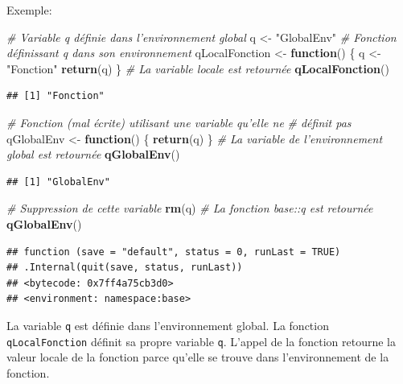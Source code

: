 \documentclass[
  12pt,
  french,
  a4paper,
  extrafontsizes,onecolumn,openright
  ]{memoir}
\newenvironment{Shaded}{\begin{snugshade}}{\end{snugshade}}
\newcommand{\CommentTok}[1]{\textcolor[rgb]{0.56,0.35,0.01}{\textit{#1}}}
\newcommand{\ControlFlowTok}[1]{\textcolor[rgb]{0.13,0.29,0.53}{\textbf{#1}}}
\newcommand{\KeywordTok}[1]{\textcolor[rgb]{0.13,0.29,0.53}{\textbf{#1}}}
\newcommand{\NormalTok}[1]{#1}
\newcommand{\StringTok}[1]{\textcolor[rgb]{0.31,0.60,0.02}{#1}}
\begin{document}
Exemple:

\scriptsize

\begin{Shaded}
\begin{Highlighting}[]
\CommentTok{# Variable q définie dans l'environnement global}
\NormalTok{q <-}\StringTok{ "GlobalEnv"}
\CommentTok{# Fonction définissant q dans son environnement}
\NormalTok{qLocalFonction <-}\StringTok{ }\ControlFlowTok{function}\NormalTok{() \{}
\NormalTok{    q <-}\StringTok{ "Fonction"}
    \KeywordTok{return}\NormalTok{(q)}
\NormalTok{\}}
\CommentTok{# La variable locale est retournée}
\KeywordTok{qLocalFonction}\NormalTok{()}
\end{Highlighting}
\end{Shaded}

\begin{verbatim}
## [1] "Fonction"
\end{verbatim}

\begin{Shaded}
\begin{Highlighting}[]
\CommentTok{# Fonction (mal écrite) utilisant une variable qu'elle ne}
\CommentTok{# définit pas}
\NormalTok{qGlobalEnv <-}\StringTok{ }\ControlFlowTok{function}\NormalTok{() \{}
    \KeywordTok{return}\NormalTok{(q)}
\NormalTok{\}}
\CommentTok{# La variable de l'environnement global est retournée}
\KeywordTok{qGlobalEnv}\NormalTok{()}
\end{Highlighting}
\end{Shaded}

\begin{verbatim}
## [1] "GlobalEnv"
\end{verbatim}

\begin{Shaded}
\begin{Highlighting}[]
\CommentTok{# Suppression de cette variable}
\KeywordTok{rm}\NormalTok{(q)}
\CommentTok{# La fonction base::q est retournée}
\KeywordTok{qGlobalEnv}\NormalTok{()}
\end{Highlighting}
\end{Shaded}

\begin{verbatim}
## function (save = "default", status = 0, runLast = TRUE) 
## .Internal(quit(save, status, runLast))
## <bytecode: 0x7ff4a75cb3d0>
## <environment: namespace:base>
\end{verbatim}

\normalsize

La variable \texttt{q} est définie dans l'environnement global.
La fonction \texttt{qLocalFonction} définit sa propre variable \texttt{q}.
L'appel de la fonction retourne la valeur locale de la fonction parce qu'elle se trouve dans l'environnement de la fonction.
\end{document}
